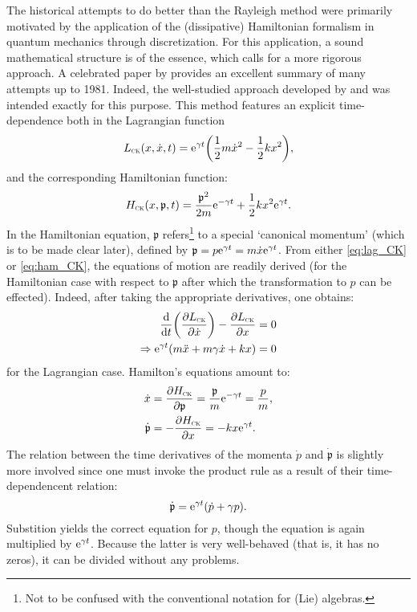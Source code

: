 The historical attempts to do better than the Rayleigh method were primarily motivated by the application of the
(dissipative) Hamiltonian formalism in quantum mechanics through discretization. For this application, a sound
mathematical structure is of the essence, which calls for a more rigorous approach. A celebrated paper by
\citet{Dekker1981} provides an excellent summary of many attempts up to 1981. Indeed, the well-studied approach
developed by \citet{Caldirola1941} and \citet{Kanai1948} was intended exactly for this purpose. This method features an
explicit time-dependence both in the Lagrangian function
\begin{equation}
    L_\text{\tiny{\textsc{CK}}}(x, \dot{x}, t) = \mathrm{e}^{\gamma t}\qty(\frac{1}{2}m\dot{x}^2 - \frac{1}{2}kx^2),
    \label{eq:lag_CK}
\end{equation}
and the corresponding Hamiltonian function:
\begin{equation}
    H_\text{\tiny{\textsc{CK}}}(x, \mathfrak{p}, t) = \frac{\mathfrak{p}^2}{2m}\mathrm{e}^{-\gamma t} + \frac{1}{2}kx^2\mathrm{e}^{\gamma t}.
    \label{eq:ham_CK}
\end{equation}
In the Hamiltonian equation, $\mathfrak{p}$ refers\footnote{Not to be confused with the conventional notation for (Lie)
algebras.} to a special `canonical momentum' (which is to be made clear later), defined by $\mathfrak{p} = p\mathrm{e}^{\gamma
t} = m\dot{x}\mathrm{e}^{\gamma t}$. From either \cref{eq:lag_CK} or \cref{eq:ham_CK}, the equations of motion are readily
derived (for the Hamiltonian case with respect to $\mathfrak{p}$ after which the transformation to $p$ can be effected).
Indeed, after taking the appropriate derivatives, one obtains:
\begin{equation*} 
    \begin{split}
        \dv{}{t}\qty(\pdv{\ensuremath{L_\text{\tiny{\textsc{CK}}}}}{\dot{x}}) - \pdv{\ensuremath{L_\text{\tiny{\textsc{CK}}}}}{x} &= 0 \\
        \Rightarrow \mathrm{e}^{\gamma t}\qty(m\ddot{x} + m\gamma\dot{x} + kx) &= 0
    \end{split}
\end{equation*}
for the Lagrangian case. Hamilton's equations amount to: \cite{Tokieda2021}
\begin{equation*}
    \begin{split}
        \dot{x} &= \pdv{\ensuremath{H_\text{\tiny{\textsc{CK}}}}}{\mathfrak{p}} = \frac{\mathfrak{p}}{m}\mathrm{e}^{-\gamma t} =  \frac{p}{m}, \\
        \dot{\mathfrak{p}} &= -\pdv{\ensuremath{H_\text{\tiny{\textsc{CK}}}}}{x} = -kx\mathrm{e}^{\gamma t}.\\
    \end{split}
\end{equation*}
The relation between the time derivatives of the momenta $\dot{p}$ and $\dot{\mathfrak{p}}$ is slightly more
involved since one must invoke the product rule as a result of their time-dependencent relation:
    $$ \dot{\mathfrak{p}} = \mathrm{e}^{\gamma t}\qty(\dot{p} + \gamma p). $$
Substition yields the correct equation for $p$, though the equation is again multiplied by $\mathrm{e}^{\gamma t}$. Because the
latter is very well-behaved (that is, it has no zeros), it can be divided without any problems.

